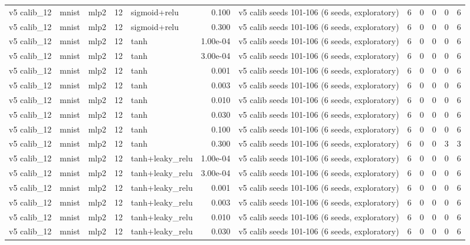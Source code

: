 \begin{table}[htbp]
{\begin{tabular}{@{}lllrlrlrrrrr@{}}
v5 calib\_12 & mnist & mlp2 & 12 & sigmoid+relu & 0.100 & v5 calib seeds 101-106 (6 seeds, exploratory) & 6 & 0 & 0 & 0 & 6 \\
v5 calib\_12 & mnist & mlp2 & 12 & sigmoid+relu & 0.300 & v5 calib seeds 101-106 (6 seeds, exploratory) & 6 & 0 & 0 & 0 & 6 \\
v5 calib\_12 & mnist & mlp2 & 12 & tanh & 1.00e-04 & v5 calib seeds 101-106 (6 seeds, exploratory) & 6 & 0 & 0 & 0 & 6 \\
v5 calib\_12 & mnist & mlp2 & 12 & tanh & 3.00e-04 & v5 calib seeds 101-106 (6 seeds, exploratory) & 6 & 0 & 0 & 0 & 6 \\
v5 calib\_12 & mnist & mlp2 & 12 & tanh & 0.001 & v5 calib seeds 101-106 (6 seeds, exploratory) & 6 & 0 & 0 & 0 & 6 \\
v5 calib\_12 & mnist & mlp2 & 12 & tanh & 0.003 & v5 calib seeds 101-106 (6 seeds, exploratory) & 6 & 0 & 0 & 0 & 6 \\
v5 calib\_12 & mnist & mlp2 & 12 & tanh & 0.010 & v5 calib seeds 101-106 (6 seeds, exploratory) & 6 & 0 & 0 & 0 & 6 \\
v5 calib\_12 & mnist & mlp2 & 12 & tanh & 0.030 & v5 calib seeds 101-106 (6 seeds, exploratory) & 6 & 0 & 0 & 0 & 6 \\
v5 calib\_12 & mnist & mlp2 & 12 & tanh & 0.100 & v5 calib seeds 101-106 (6 seeds, exploratory) & 6 & 0 & 0 & 0 & 6 \\
v5 calib\_12 & mnist & mlp2 & 12 & tanh & 0.300 & v5 calib seeds 101-106 (6 seeds, exploratory) & 6 & 0 & 0 & 3 & 3 \\
v5 calib\_12 & mnist & mlp2 & 12 & tanh+leaky\_relu & 1.00e-04 & v5 calib seeds 101-106 (6 seeds, exploratory) & 6 & 0 & 0 & 0 & 6 \\
v5 calib\_12 & mnist & mlp2 & 12 & tanh+leaky\_relu & 3.00e-04 & v5 calib seeds 101-106 (6 seeds, exploratory) & 6 & 0 & 0 & 0 & 6 \\
v5 calib\_12 & mnist & mlp2 & 12 & tanh+leaky\_relu & 0.001 & v5 calib seeds 101-106 (6 seeds, exploratory) & 6 & 0 & 0 & 0 & 6 \\
v5 calib\_12 & mnist & mlp2 & 12 & tanh+leaky\_relu & 0.003 & v5 calib seeds 101-106 (6 seeds, exploratory) & 6 & 0 & 0 & 0 & 6 \\
v5 calib\_12 & mnist & mlp2 & 12 & tanh+leaky\_relu & 0.010 & v5 calib seeds 101-106 (6 seeds, exploratory) & 6 & 0 & 0 & 0 & 6 \\
v5 calib\_12 & mnist & mlp2 & 12 & tanh+leaky\_relu & 0.030 & v5 calib seeds 101-106 (6 seeds, exploratory) & 6 & 0 & 0 & 0 & 6 \\

\end{tabular}}
\end{table}
